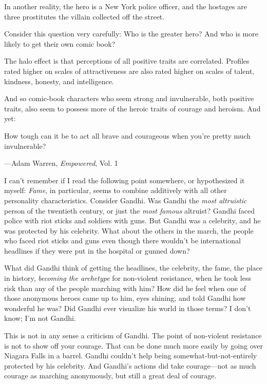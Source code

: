 {
 In another reality, the hero is a New York police officer, and the
hostages are three prostitutes the villain collected off the street.}

{
 Consider this question very carefully: Who is the greater hero?
And who is more likely to get their own comic book?}

{
 The halo effect is that perceptions of all positive traits are
correlated. Profiles rated higher on scales of attractiveness are also
rated higher on scales of talent, kindness, honesty, and intelligence.}

{
 And so comic-book characters who seem strong and invulnerable,
both positive traits, also seem to possess more of the heroic traits of
courage and heroism. And yet:}

{
 How tough can it be to act all brave and courageous when
you're pretty much invulnerable?}

{\raggedleft
 {}---Adam Warren, \textit{Empowered}, Vol. 1
\par}


\bigskip

{
 I can't remember if I read the following point
somewhere, or hypothesized it myself: \textit{Fame}, in particular,
seems to combine additively with all other personality characteristics.
Consider Gandhi. Was Gandhi the \textit{most altruistic} person of the
twentieth century, or just the \textit{most famous} altruist? Gandhi
faced police with riot sticks and soldiers with guns. But Gandhi was a
celebrity, and he was protected by his celebrity. What about the others
in the march, the people who faced riot sticks and guns even though
there wouldn't be international headlines if they were
put in the hospital or gunned down?}

{
 What did Gandhi think of getting the headlines, the celebrity, the
fame, the place in history, \textit{becoming the archetype} for
non-violent resistance, when he took less risk than any of the people
marching with him? How did he feel when one of those anonymous heroes
came up to him, eyes shining, and told Gandhi how wonderful he was? Did
Gandhi ever visualize his world in those terms? I don't
know; I'm not Gandhi.}

{
 This is not in any sense a criticism of Gandhi. The point of
non-violent resistance is not to show off your courage. That can be
done much more easily by going over Niagara Falls in a barrel. Gandhi
couldn't help being somewhat-but-not-entirely protected
by his celebrity. And Gandhi's actions did take
courage---not as much courage as marching anonymously, but still a
great deal of courage.}

